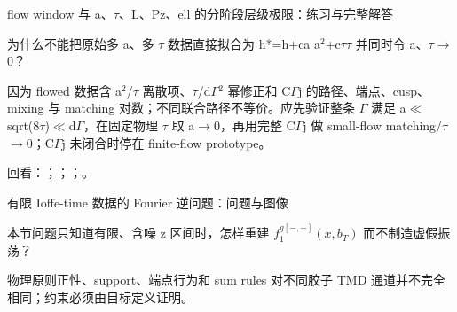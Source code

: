 \begin{frame}[t]{flow window 与 a、\ensuremath{\tau}、L、Pz、ell 的分阶段层级极限：练习与完整解答}
\footnotesize
\begin{block}{}为什么不能把原始多 a、多 \ensuremath{\tau} 数据直接拟合为 h*=h+ca a\ensuremath{^{2}}+c\ensuremath{\tau}\ensuremath{\tau} 并同时令 a、\ensuremath{\tau}\ensuremath{\rightarrow}0？\end{block}
\begin{exampleblock}{}因为 flowed 数据含 a\ensuremath{^{2}}/\allowbreak{}\ensuremath{\tau} 离散项、\ensuremath{\tau}/\allowbreak{}d\ensuremath{\Gamma}\ensuremath{^{2}} 幂修正和 C\ensuremath{\Gamma}j 的路径、端点、cusp、mixing 与 matching 对数；不同联合路径不等价。应先验证整条 \ensuremath{\Gamma} 满足 a\ensuremath{\ll}sqrt(8\ensuremath{\tau})\ensuremath{\ll}d\ensuremath{\Gamma}，在固定物理 \ensuremath{\tau} 取 a\ensuremath{\rightarrow}0，再用完整 C\ensuremath{\Gamma}j 做 small-flow matching/\allowbreak{}\ensuremath{\tau}\ensuremath{\rightarrow}0；C\ensuremath{\Gamma}j 未闭合时停在 finite-flow prototype。\end{exampleblock}
\vfill
\scriptsize 回看：；；；。
\end{frame}

\begin{frame}[t]{有限 Ioffe-time 数据的 Fourier 逆问题：问题与图像}
\footnotesize
\begin{block}{本节问题}只知道有限、含噪 z 区间时，怎样重建 \ensuremath{f_1^{g[-,-]}(x,b_T)} 而不制造虚假振荡？\end{block}
\begin{block}{物理原则}\quad 正性、support、端点行为和 sum rules 对不同胶子 TMD 通道并不完全相同；约束必须由目标定义证明。\end{block}
\end{frame}

